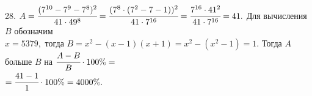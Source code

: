 28. $A=\cfrac{(7^{10}-7^9-7^8)^2}{41\cdot49^8}=\cfrac{(7^8\cdot(7^2-7-1))^2}{41\cdot7^{16}}=\cfrac{7^{16}\cdot41^2}{41\cdot7^{16}}=41.$ Для вычисления $B$ обозначим\\ $x=5379,$ тогда $B=x^2-(x-1)(x+1)=x^2-(x^2-1)=1.$ Тогда $A$ больше $B$ на $\cfrac{A-B}{B}\cdot100\%=$\\$=\cfrac{41-1}{1}\cdot100\%=4000\%.$\\
